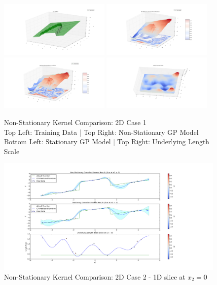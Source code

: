 				\begin{figure}[!htbp]
					\centering
						\includegraphics[width=0.48\textwidth]{Figures/Progress/figure_2Dcase2_1.png}
						\includegraphics[width=0.48\textwidth]{Figures/Progress/figure_2Dcase2_2.png}
						\includegraphics[width=0.48\textwidth]{Figures/Progress/figure_2Dcase2_3.png}
						\includegraphics[width=0.48\textwidth]{Figures/Progress/figure_2Dcase2_4.png}
					\caption{Non-Stationary Kernel Comparison: 2D Case 1 \\
						Top Left: Training Data | Top Right: Non-Stationary GP Model \\
						Bottom Left: Stationary GP Model | Top Right: Underlying Length Scale}
					\label{ProgressReport:GaussianProcessModels:Figure:figure_2Dcase2}
				\end{figure}

				\begin{figure}[!htbp]
					\centering
						\includegraphics[width=\textwidth]{Figures/Progress/figure_2Dcase2_5.png}
					\caption{Non-Stationary Kernel Comparison: 2D Case 2 - 1D slice at $x_{2} = 0$}
					\label{ProgressReport:GaussianProcessModels:Figure:figure_2Dcase2_5}
				\end{figure}

